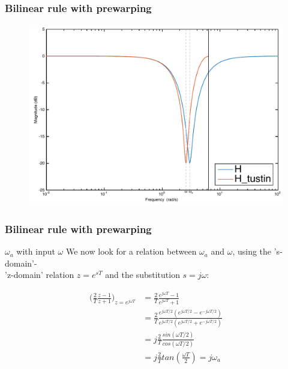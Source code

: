 \begin{frame}
	\frametitle{Bilinear rule with prewarping}
	\vspace{-0.5em}
	\begin{figure}
		\centering
		\includegraphics[width=0.85\linewidth]{Distortion_bode}
	\end{figure}
\end{frame}

\begin{frame}
	\frametitle{Bilinear rule with prewarping}
	\begin{block}{$\omega_a$ with input $\omega$}
		We now look for a relation between $\omega_a$ and $\omega$, using the 's-domain'-\\'z-domain' relation $z = e^{sT}$ and the substitution $s=j\omega$:
		\vspace{-2em} 
		\begin{center}
			\begin{align*}
			\big(\frac{2}{T} \frac{z-1}{z+1}\big)_{z = e^{j\omega T}} &=\frac{2}{T} \frac{e^{j\omega T}-1}{e^{j\omega T}+1}\\
			&= \frac{2}{T} \frac{e^{j\omega T/2} (e^{j\omega T/2} - e^{-j\omega T/2})}{e^{j\omega T/2}(e^{j\omega T/2} + e^{-j\omega T/2})}\\
			&= j \frac{2}{T} \frac{sin(\omega T/2)}{cos(\omega T/2)}\\
			&= j \frac{2}{T} tan(\frac{\omega T}{2}) = j\omega_a
			\end{align*}
		\end{center}
	\end{block}
\end{frame}

